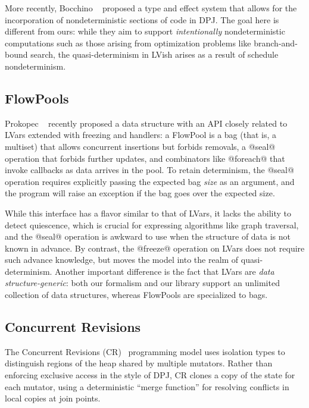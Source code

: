 More recently, Bocchino \etal~\cite{dpj-popl} proposed a type and
effect system that allows for the incorporation of nondeterministic
sections of code in DPJ.  The goal here is different from ours: while
they aim to support \emph{intentionally} nondeterministic computations
such as those arising from optimization problems like branch-and-bound
search, the quasi-determinism in LVish arises as a result of schedule
nondeterminism.

\subsection{FlowPools}

Prokopec \etal~\cite{flowpools} recently proposed a data structure
with an API closely related to LVars extended with freezing and
handlers: a FlowPool is a bag (that is, a multiset) that allows
concurrent insertions but forbids removals, a @seal@ operation that
forbids further updates, and combinators like @foreach@ that invoke
callbacks as data arrives in the pool.  To retain determinism, the
@seal@ operation requires explicitly passing the expected bag
\emph{size} as an argument, and the program will raise an exception if
the bag goes over the expected size.

While this interface has a flavor similar to that of LVars, it lacks
the ability to detect quiescence, which is crucial for expressing
algorithms like graph traversal, and the @seal@ operation is awkward
to use when the structure of data is not known in advance.  By
contrast, the @freeze@ operation on LVars does not require such
advance knowledge, but moves the model into the realm of
quasi-determinism.  Another important difference is the fact that
LVars are \emph{data structure-generic}: both our formalism and our
library support an unlimited collection of data structures, whereas
FlowPools are specialized to bags.

\subsection{Concurrent Revisions}

The Concurrent Revisions (CR)~\cite{concurrent-revisions-haskell11}
programming model uses isolation types to distinguish regions of the
heap shared by multiple mutators.  Rather than enforcing exclusive
access in the style of DPJ, CR clones a copy of the state for each
mutator, using a deterministic ``merge function'' for resolving
conflicts in local copies at join points.

